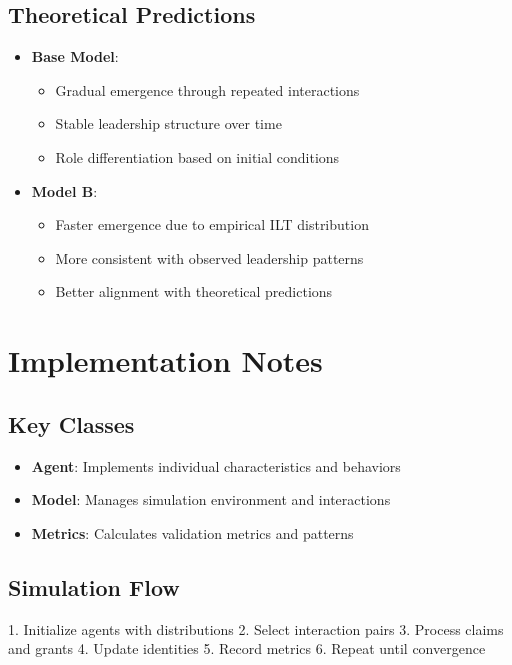 \documentclass[12pt]{article}
\begin{document}
\subsection{Theoretical Predictions}
\begin{itemize}
\item \textbf{Base Model}:
  \begin{itemize}
  \item Gradual emergence through repeated interactions
  \item Stable leadership structure over time
  \item Role differentiation based on initial conditions
  \end{itemize}
\item \textbf{Model B}:
  \begin{itemize}
  \item Faster emergence due to empirical ILT distribution
  \item More consistent with observed leadership patterns
  \item Better alignment with theoretical predictions
  \end{itemize}
\end{itemize}

\section{Implementation Notes}

\subsection{Key Classes}
\begin{itemize}
\item \textbf{Agent}: Implements individual characteristics and behaviors
\item \textbf{Model}: Manages simulation environment and interactions
\item \textbf{Metrics}: Calculates validation metrics and patterns
\end{itemize}

\subsection{Simulation Flow}
1. Initialize agents with distributions
2. Select interaction pairs
3. Process claims and grants
4. Update identities
5. Record metrics
6. Repeat until convergence
\end{document}
